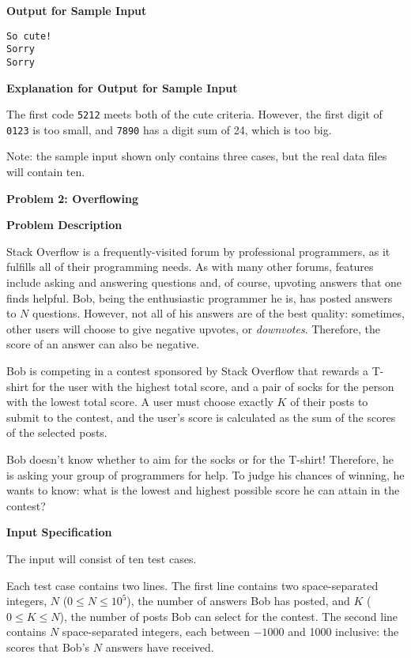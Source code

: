 \documentclass[11pt]{article}
\newcommand{\problem}[2]{\textbf{\Large Problem #1: #2} \vspace{0.4em}}
\newcommand{\heading}[1]{\vspace{0.6em} \textbf{#1}}
\begin{document}
\vspace{-\topsep}
\heading{Output for Sample Input}
\vspace{-\topsep}
\begin{verbatim}
So cute!
Sorry
Sorry
\end{verbatim}

\vspace{-\topsep}
\heading{Explanation for Output for Sample Input}

The first code \verb|5212| meets both of the cute criteria. However, the first digit of \verb|0123| is too small, and \verb|7890| has a digit sum of 24, which is too big.

Note: the sample input shown only contains three cases, but the real data files will contain ten.


\pagebreak




\problem{2}{Overflowing}


\heading{Problem Description}

Stack Overflow is a frequently-visited forum by professional programmers, as it fulfills all of their programming needs. As with many other forums, features include asking and answering questions and, of course, upvoting answers that one finds helpful. Bob, being the enthusiastic programmer he is, has posted answers to $N$ questions. However, not all of his answers are of the best quality: sometimes, other users will choose to give negative upvotes, or \textit{downvotes}. Therefore, the score of an answer can also be negative.

Bob is competing in a contest sponsored by Stack Overflow that rewards a T-shirt for the user with the highest total score, and a pair of socks for the person with the lowest total score. A user must choose exactly $K$ of their posts to submit to the contest, and the user’s score is calculated as the sum of the scores of the selected posts.

Bob doesn't know whether to aim for the socks or for the T-shirt! Therefore, he is asking your group of programmers for help. To judge his chances of winning, he wants to know: what is the lowest and highest possible score he can attain in the contest?

\heading{Input Specification}

The input will consist of ten test cases.

Each test case contains two lines. The first line contains two space-separated integers, $N$ ($0 \le N \le 10^5$), the number of answers Bob has posted, and $K$ ($0 \le K \le N$), the number of posts Bob can select for the contest. The second line contains $N$ space-separated integers, each between $-1000$ and 1000 inclusive: the scores that Bob's $N$ answers have received.
\end{document}
